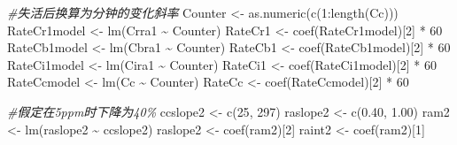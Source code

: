 \documentclass[
]{krantz}
\makeatletter
\newenvironment{Shaded}{\begin{snugshade}}{\end{snugshade}}
\newcommand{\CommentTok}[1]{\textcolor[rgb]{0.56,0.35,0.01}{\textit{#1}}}
\newcommand{\DecValTok}[1]{\textcolor[rgb]{0.00,0.00,0.81}{#1}}
\newcommand{\FloatTok}[1]{\textcolor[rgb]{0.00,0.00,0.81}{#1}}
\newcommand{\FunctionTok}[1]{\textcolor[rgb]{0.00,0.00,0.00}{#1}}
\newcommand{\NormalTok}[1]{#1}
\newcommand{\OtherTok}[1]{\textcolor[rgb]{0.56,0.35,0.01}{#1}}
\newcommand{\SpecialCharTok}[1]{\textcolor[rgb]{0.00,0.00,0.00}{#1}}
\newenvironment{kframe}{%
\medskip{}
\setlength{\fboxsep}{.8em}
 \def\at@end@of@kframe{}%
 \ifinner\ifhmode%
  \def\at@end@of@kframe{\end{minipage}}%
  \begin{minipage}{\columnwidth}%
 \fi\fi%
 \def\FrameCommand##1{\hskip\@totalleftmargin \hskip-\fboxsep
 \colorbox{shadecolor}{##1}\hskip-\fboxsep
     \hskip-\linewidth \hskip-\@totalleftmargin \hskip\columnwidth}%
 \MakeFramed {\advance\hsize-\width
   \@totalleftmargin\z@ \linewidth\hsize
   \@setminipage}}%
 {\par\unskip\endMakeFramed%
 \at@end@of@kframe}
\renewenvironment{Shaded}{\begin{kframe}}{\end{kframe}}
\makeatother
\begin{document}
\begin{Shaded}
\begin{Highlighting}[]
\CommentTok{\#失活后换算为分钟的变化斜率}
\NormalTok{Counter }\OtherTok{\textless{}{-}} \FunctionTok{as.numeric}\NormalTok{(}\FunctionTok{c}\NormalTok{(}\DecValTok{1}\SpecialCharTok{:}\FunctionTok{length}\NormalTok{(Cc)))}
\NormalTok{RateCr1model }\OtherTok{\textless{}{-}} \FunctionTok{lm}\NormalTok{(Crra1 }\SpecialCharTok{\textasciitilde{}}\NormalTok{ Counter)}
\NormalTok{RateCr1 }\OtherTok{\textless{}{-}} \FunctionTok{coef}\NormalTok{(RateCr1model)[}\DecValTok{2}\NormalTok{] }\SpecialCharTok{*} \DecValTok{60}
\NormalTok{RateCb1model }\OtherTok{\textless{}{-}} \FunctionTok{lm}\NormalTok{(Cbra1 }\SpecialCharTok{\textasciitilde{}}\NormalTok{ Counter)}
\NormalTok{RateCb1 }\OtherTok{\textless{}{-}} \FunctionTok{coef}\NormalTok{(RateCb1model)[}\DecValTok{2}\NormalTok{] }\SpecialCharTok{*} \DecValTok{60}
\NormalTok{RateCi1model }\OtherTok{\textless{}{-}} \FunctionTok{lm}\NormalTok{(Cira1 }\SpecialCharTok{\textasciitilde{}}\NormalTok{ Counter)}
\NormalTok{RateCi1 }\OtherTok{\textless{}{-}} \FunctionTok{coef}\NormalTok{(RateCi1model)[}\DecValTok{2}\NormalTok{] }\SpecialCharTok{*} \DecValTok{60}
\NormalTok{RateCcmodel }\OtherTok{\textless{}{-}} \FunctionTok{lm}\NormalTok{(Cc }\SpecialCharTok{\textasciitilde{}}\NormalTok{ Counter)}
\NormalTok{RateCc }\OtherTok{\textless{}{-}} \FunctionTok{coef}\NormalTok{(RateCcmodel)[}\DecValTok{2}\NormalTok{] }\SpecialCharTok{*} \DecValTok{60}

\CommentTok{\#假定在5ppm时下降为40\%}
\NormalTok{ccslope2 }\OtherTok{\textless{}{-}} \FunctionTok{c}\NormalTok{(}\DecValTok{25}\NormalTok{, }\DecValTok{297}\NormalTok{)}
\NormalTok{raslope2 }\OtherTok{\textless{}{-}} \FunctionTok{c}\NormalTok{(}\FloatTok{0.40}\NormalTok{, }\FloatTok{1.00}\NormalTok{)}
\NormalTok{ram2 }\OtherTok{\textless{}{-}} \FunctionTok{lm}\NormalTok{(raslope2 }\SpecialCharTok{\textasciitilde{}}\NormalTok{ ccslope2)}
\NormalTok{raslope2 }\OtherTok{\textless{}{-}} \FunctionTok{coef}\NormalTok{(ram2)[}\DecValTok{2}\NormalTok{]}
\NormalTok{raint2 }\OtherTok{\textless{}{-}} \FunctionTok{coef}\NormalTok{(ram2)[}\DecValTok{1}\NormalTok{]}


\end{Highlighting}
\end{Shaded}
\end{document}
